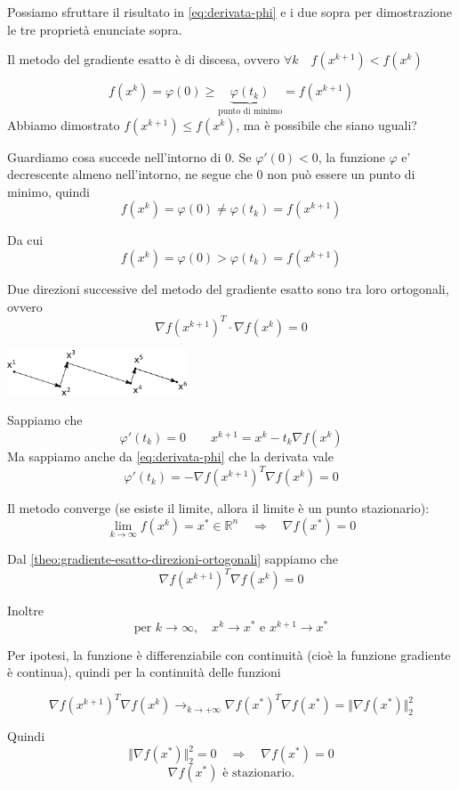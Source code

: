 Possiamo sfruttare il risultato in \ref{eq:derivata-phi} e i due sopra
per dimostrazione le tre propriet\`a enunciate sopra.

\begin{theo} Il metodo del gradiente esatto \`e di discesa, ovvero
$\forall k \quad f(x^{k+1}) < f(x^{k})$
\begin{thproof}
$$f(x^{k}) = \varphi(0) \geq \underbrace{\varphi(t_{k})}_{\text{punto di minimo}} = f(x^{k+1})$$
Abbiamo dimostrato $f(x^{k+1}) \leq f(x^{k})$, ma \`e possibile che
siano uguali?

Guardiamo cosa succede nell'intorno di $0$. Se $\varphi'(0) < 0$, la
funzione $\varphi$ e' decrescente almeno nell'intorno, ne segue che
$0$ non può essere un punto di minimo, quindi
$$f(x^{k}) = \varphi(0) \neq \varphi(t_{k}) = f(x^{k+1})$$

Da cui
 $$f(x^{k}) = \varphi(0) > \varphi(t_{k}) = f(x^{k+1})$$
\end{thproof}
\end{theo}

\begin{theo}
\label{theo:gradiente-esatto-direzioni-ortogonali} Due direzioni
successive del metodo del gradiente esatto sono tra loro ortogonali,
ovvero $$ \nabla f(x^{k+1})^{T} \cdot \nabla f(x^{k}) = 0$$
\centerline{\includegraphics[width=0.40\textwidth]{imgs/direzioni-ortogonali.png}}

\begin{thproof} Sappiamo che $$ \varphi'(t_{k}) = 0 \qquad x^{k+1} =
x^{k} - t_k \nabla f(x^{k})$$ Ma sappiamo anche da
\ref{eq:derivata-phi} che la derivata vale
$$\varphi'(t_{k}) = - \nabla f(x^{k+1})^{T} \nabla f(x^{k}) = 0$$
\end{thproof}
\end{theo}

\begin{theo} Il metodo converge (se esiste il limite, allora il limite
\`e un punto stazionario):
$$\lim_{k \to \infty} f(x^k) = x^* \in \mathbb{R}^n \quad \Longrightarrow \quad \nabla f(x^*) = 0 $$
\begin{thproof} Dal \ref{theo:gradiente-esatto-direzioni-ortogonali}
sappiamo che
$$ \nabla f(x^{k+1})^{T} \nabla f(x^{k})= 0$$

Inoltre
$$\text{per } k \to \infty, \quad x^k \to x^*\text{ e }x^{k+1} \to x^*$$

Per ipotesi, la funzione \`e differenziabile con continuit\`a (cio\`e la
funzione gradiente \`e continua), quindi per la continuit\`a delle
funzioni

$$ \nabla f(x^{k+1})^{T} \nabla f(x^{k}) \longrightarrow_{k \to +\infty} 
    \nabla f(x^{*})^{T} \nabla f(x^{*}) = \Vert \nabla
f(x^{*})\Vert_{2}^{2}$$
      
Quindi $$\Vert \nabla f(x^{*})\Vert_{2}^{2} = 0 \quad \Longrightarrow
\quad \nabla f(x^*) = 0$$
$$\nabla f(x^*) \text{ \`e stazionario.}$$
\end{thproof}
\end{theo}

